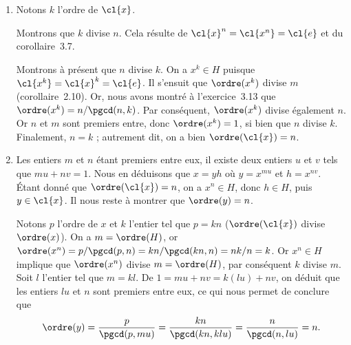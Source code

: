 
\begin{enumerate}
  \item %
    Notons $k$ l'ordre de $\cl{x}$.

    Montrons que $k$ divise $n$.
    Cela résulte de $\cl{x}^n = \cl{x^n} = \cl{e}$ et du corollaire~3.7.

    Montrons à présent que $n$ divise $k$.
    On a $x^k\in H$ puisque $\cl{x^k} = \cl{x}^k = \cl{e}$.
    Il s'ensuit que $\ordre(x^k)$ divise $m$ (corollaire~2.10).
    Or, nous avons montré à l'exercice~3.13 que $\ordre(x^k) = n/\pgcd(n, k)$.
    Par conséquent, $\ordre(x^k)$ divise également $n$.
    Or $n$ et $m$ sont premiers entre, donc $\ordre(x^k) = 1$, si bien que $n$ divise $k$.
    Finalement, $n = k$ ; autrement dit, on a bien $\ordre(\cl{x}) = n$.

  \item %
    Les entiers $m$ et $n$ étant premiers entre eux, il existe deux entiers $u$ et $v$ tels que $mu + nv = 1$.
    Nous en déduisons que $x = yh$ où $y = x^{mu}$ et $h =  x^{nv}$.
    Étant donné que $\ordre(\cl{x}) = n$, on a $x^n\in H$, donc $h\in H$, puis $y\in\cl{x}$.
    Il nous reste à montrer que $\ordre(y) = n$.

    Notons $p$ l'ordre de $x$ et $k$ l'entier tel que $p = kn$ ($\ordre(\cl{x})$ divise $\ordre(x)$).
    On a $m = \ordre(H)$, or $\ordre(x^n) = p/\pgcd(p, n) = kn/\pgcd(kn, n) = nk/n = k$.
    Or $x^n\in H$ implique que $\ordre(x^n)$ divise $m = \ordre(H)$, par conséquent $k$ divise $m$.
    Soit $l$ l'entier tel que $m = kl$.
    De  $1 = mu + nv = k(lu) + nv$, on déduit que les entiers $lu$ et $n$ sont premiers entre eux, ce qui nous permet de conclure que
    \[
      \ordre(y) = \frac{p}{\pgcd(p, mu)} = \frac{kn}{\pgcd(kn, klu)} = \frac{n}{\pgcd(n, lu)} = n.
    \]
\end{enumerate}
